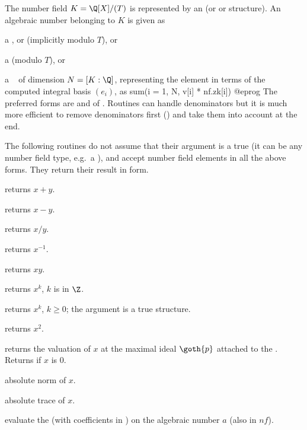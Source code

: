 The number field $K = \Q[X]/(T)$ is represented by an  (or 
or  structure). An algebraic number belonging to $K$ is given as

\item a ,  or  (implicitly modulo $T$), or

\item a  (modulo $T$), or

\item a ~ of dimension $N = [K:\Q]$, representing
the element in terms of the computed integral basis $(e_i)$, as
\bprog
  sum(i = 1, N, v[i] * nf.zk[i])
@eprog
The preferred forms are  and  of . Routines can
handle denominators but it is much more efficient to remove  denominators
first () and take them into account at the end.

 The following routines do not assume that their
 argument is a true  (it can be any number field type, e.g.~a
), and accept number field elements in all the above forms. They
return their result in  form.

 returns $x+y$.

 returns $x-y$.

 returns $x / y$.

 returns $x^{-1}$.

 returns $xy$.

 returns $x^k$, $k$ is in $\Z$.

 returns $x^k$, $k\geq 0$; the
argument  is a true  structure.

 returns $x^2$.

 returns the valuation of $x$ at the
maximal ideal $\goth{p}$ attached to the  .
Returns  if $x$ is $0$.

 absolute norm of $x$.

 absolute trace of $x$.

 evaluate the  
(with coefficients in ) on the algebraic number $a$ (also in $nf$).

